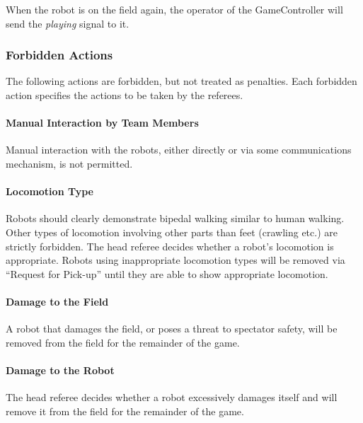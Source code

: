 When the robot is on the field again, the operator of the GameController will send the \emph{playing} signal to it.

\subsubsection{Forbidden Actions}

The following actions are forbidden, but not treated as penalties.
Each forbidden action specifies the actions to be taken by the referees.

\paragraph{Manual Interaction by Team Members}

Manual interaction with the robots, either directly or via some communications mechanism, is not permitted.

\paragraph{Locomotion Type}
\label{sec:locomotion_type}

Robots should clearly demonstrate bipedal walking similar to human walking. Other types of locomotion involving other parts than feet (crawling etc.) are strictly forbidden.
The head referee decides whether a robot's locomotion is appropriate. Robots using inappropriate locomotion types will be removed via ``Request for Pick-up'' until they are able to show appropriate locomotion.

\paragraph{Damage to the Field}
\label{sec:damage}

A robot that damages the field, or poses a threat to spectator safety, will be removed from the field for the remainder of the game.

\paragraph{Damage to the Robot}
\label{sec:damage}

The head referee decides whether a robot excessively damages itself and will remove it from the field for the remainder of the game.


